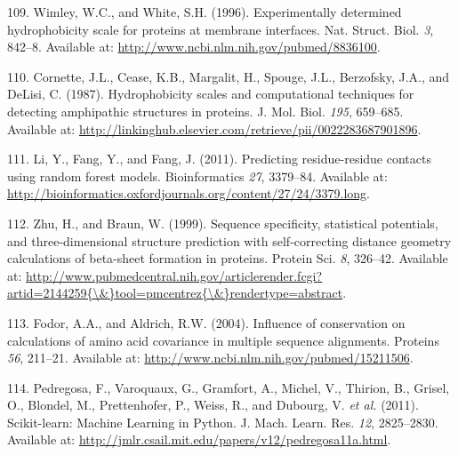 \documentclass[12pt,a4paper,twoside]{book}
\theoremstyle{definition}
\theoremstyle{definition}
\theoremstyle{remark}
\begin{document}
\hypertarget{ref-Wimley1996}{}
109. Wimley, W.C., and White, S.H. (1996). Experimentally determined
hydrophobicity scale for proteins at membrane interfaces. Nat. Struct.
Biol. \emph{3}, 842--8. Available at:
\url{http://www.ncbi.nlm.nih.gov/pubmed/8836100}.

\hypertarget{ref-Cornette1987}{}
110. Cornette, J.L., Cease, K.B., Margalit, H., Spouge, J.L., Berzofsky,
J.A., and DeLisi, C. (1987). Hydrophobicity scales and computational
techniques for detecting amphipathic structures in proteins. J. Mol.
Biol. \emph{195}, 659--685. Available at:
\url{http://linkinghub.elsevier.com/retrieve/pii/0022283687901896}.

\hypertarget{ref-Li2011}{}
111. Li, Y., Fang, Y., and Fang, J. (2011). Predicting residue-residue
contacts using random forest models. Bioinformatics \emph{27}, 3379--84.
Available at:
\url{http://bioinformatics.oxfordjournals.org/content/27/24/3379.long}.

\hypertarget{ref-Zhu1999}{}
112. Zhu, H., and Braun, W. (1999). Sequence specificity, statistical
potentials, and three-dimensional structure prediction with
self-correcting distance geometry calculations of beta-sheet formation
in proteins. Protein Sci. \emph{8}, 326--42. Available at:
\href{http://www.pubmedcentral.nih.gov/articlerender.fcgi?artid=2144259\%7B/\&\%7Dtool=pmcentrez\%7B/\&\%7Drendertype=abstract}{http://www.pubmedcentral.nih.gov/articlerender.fcgi?artid=2144259\{\textbackslash{}\&\}tool=pmcentrez\{\textbackslash{}\&\}rendertype=abstract}.

\hypertarget{ref-Fodor2004a}{}
113. Fodor, A.A., and Aldrich, R.W. (2004). Influence of conservation on
calculations of amino acid covariance in multiple sequence alignments.
Proteins \emph{56}, 211--21. Available at:
\url{http://www.ncbi.nlm.nih.gov/pubmed/15211506}.

\hypertarget{ref-Pedregosa2011}{}
114. Pedregosa, F., Varoquaux, G., Gramfort, A., Michel, V., Thirion,
B., Grisel, O., Blondel, M., Prettenhofer, P., Weiss, R., and Dubourg,
V. \emph{et al.} (2011). Scikit-learn: Machine Learning in Python. J.
Mach. Learn. Res. \emph{12}, 2825--2830. Available at:
\url{http://jmlr.csail.mit.edu/papers/v12/pedregosa11a.html}.
\end{document}

